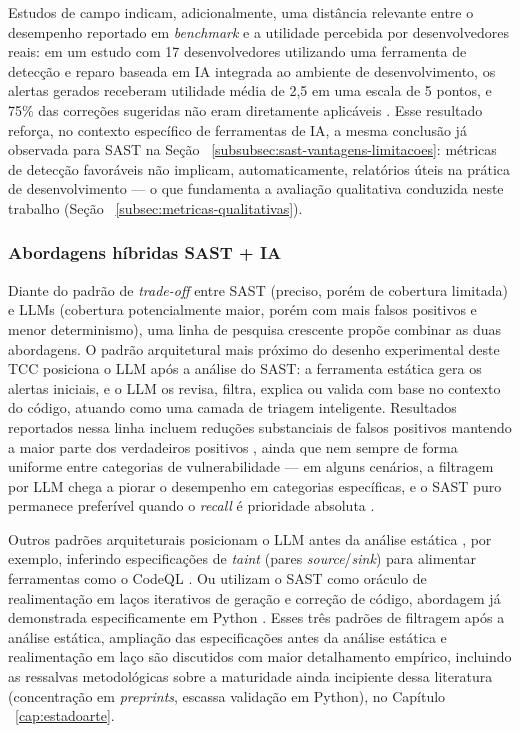 Estudos de campo indicam, adicionalmente, uma distância relevante entre o desempenho reportado em \textit{benchmark} e a utilidade percebida por desenvolvedores reais: em um estudo com 17 desenvolvedores utilizando uma ferramenta de detecção e reparo baseada em IA integrada ao ambiente de desenvolvimento, os alertas gerados receberam utilidade média de 2,5 em uma escala de 5 pontos, e 75\% das correções sugeridas não eram diretamente aplicáveis \cite{Steenhoek2025IDEUserStudy}. Esse resultado reforça, no contexto específico de ferramentas de IA, a mesma conclusão já observada para SAST na Seção ~\ref{subsubsec:sast-vantagens-limitacoes}: métricas de detecção favoráveis não implicam, automaticamente, relatórios úteis na prática de desenvolvimento — o que fundamenta a avaliação qualitativa conduzida neste trabalho (Seção ~\ref{subsec:metricas-qualitativas}).

\subsubsection{Abordagens híbridas SAST + IA}\label{subsubsec:hibrido-sast-ia}
Diante do padrão de \textit{trade-off} entre SAST (preciso, porém de cobertura limitada) e LLMs (cobertura potencialmente maior, porém com mais falsos positivos e menor determinismo), uma linha de pesquisa crescente propõe combinar as duas abordagens. O padrão arquitetural mais próximo do desenho experimental deste TCC posiciona o LLM após a análise do SAST: a ferramenta estática gera os alertas iniciais, e o LLM os revisa, filtra, explica ou valida com base no contexto do código, atuando como uma camada de triagem inteligente. Resultados reportados nessa linha incluem reduções substanciais de falsos positivos mantendo a maior parte dos verdadeiros positivos \cite{Ameen2026QASecClaw, Iranmanesh2025ZeroFalse, Agrawal2025SASTGenius}, ainda que nem sempre de forma uniforme entre categorias de vulnerabilidade — em alguns cenários, a filtragem por LLM chega a piorar o desempenho em categorias específicas, e o SAST puro permanece preferível quando o \textit{recall} é prioridade absoluta \cite{Ciavatta2026LLMSAST}.

Outros padrões arquiteturais posicionam o LLM antes da análise estática , por exemplo, inferindo especificações de \textit{taint} (pares \textit{source}/\textit{sink}) para alimentar ferramentas como o CodeQL \cite{Li2025IRIS}. Ou utilizam o SAST como oráculo de realimentação em laços iterativos de geração e correção de código, abordagem já demonstrada especificamente em Python \cite{Alrashedy2025FDSP, Lee2026CodeEnhancer}. Esses três padrões de filtragem após a análise estática, ampliação das especificações antes da análise estática e realimentação em laço  são discutidos com maior detalhamento empírico, incluindo as ressalvas metodológicas sobre a maturidade ainda incipiente dessa literatura (concentração em \textit{preprints}, escassa validação em Python), no Capítulo ~\ref{cap:estadoarte}.


